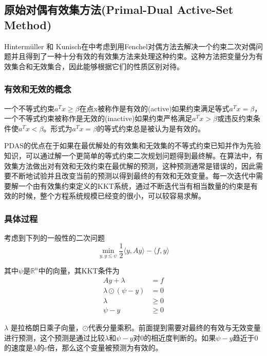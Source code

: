\documentclass[a4paper,12pt]{article}
\begin{document}
\subsection{原始对偶有效集方法(Primal-Dual Active-Set Method)}
Hintermüller 和 Kunisch在\cite{Hintermller:2006pd}中考虑到用Fenchel对偶方法去解决一个约束二次对偶问题并且得到了一种十分有效的有效集方法来处理这种约束。这种方法把变量分为有效集合和无效集合，因此能够根据它们的性质区别对待。

\subsubsection{有效和无效的概念}

一个不等式约束$a^Tx\geq\beta$在点x被称作是有效的(active)如果约束满足等式$a^Tx=\beta$，一个不等式约束被称作是无效的(inactive)如果约束严格满足$a^Tx>\beta$或违反约束条件使$a^Tx<\beta$。形式为$a^Tx=\beta$的等式约束总是被认为是有效的\cite{Maes:2010pd}。

PDAS的优点在于如果在最优解处的有效集和无效集的不等式约束已知并作为先验知识，可以通过解一个更简单的等式约束二次规划问题得到最终解。在算法中，有效集方法做出对有效和无效约束在最优解的预测，这种预测通常是错误的，因此需要不断地试验并且改变当前的预测以得到最终的有效和无效变量。每一次迭代中需要解一个由有效集约束定义的KKT系统，通过不断迭代当有相当数量的约束是有效的时候，整个方程系统规模已经变的很小，可以较容易求解。

\subsubsection{具体过程}

考虑到下列的一般性的二次问题
\begin{displaymath}
\min_{y,y\leq\psi }\frac{1}{2}\langle y,Ay\rangle-\langle f,y\rangle
\end{displaymath}

其中$\psi$是$\mathbb{R}^n$中的向量，其KKT条件为
\begin{equation}
\begin{split}
Ay+\lambda&=f\\
\lambda\odot(\psi-y)&=0\\
\lambda&\geq0\\
\psi-y&\geq0
\end{split}
\end{equation}

$\lambda$ 是拉格朗日乘子向量，$\odot$代表分量乘积。前面提到需要对最终的有效与无效变量进行预测，这个预测是通过比较$\lambda$和$\psi-y$对0的相近度判断的。如果$\psi-y$趋近于0的速度是$\lambda$的c倍，那么这个变量被预测为有效的。
\end{document}
